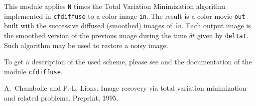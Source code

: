 
This module applies \verb+N+ times the Total Variation Minimization algorithm 
implemented in \verb+cfdiffuse+ to a color image \verb+in+.
The result is a color movie \verb+out+ built with the successive diffused (smoothed) images of \verb+in+.
Each output image is the smoothed version of the previous image during the time $\delta t$ given by \verb+deltat+.
Such algorithm may be used to restore a noisy image.

To get a description of the used scheme, please see \cite{ChambolleLions} and
the documentation of the module \verb+cfdiffuse+.

\begin{thebibliography}{99}
A.~Chambolle and P.-L. Lions.
\newblock Image recovery via total variation minimization and related problems.
\newblock Preprint, 1995.
\end{thebibliography}
